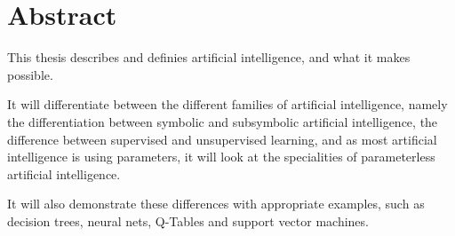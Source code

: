 \chapter*{Abstract}
This thesis describes and definies artificial intelligence, and what it makes possible. 

It will differentiate between the different families of artificial intelligence, namely the differentiation between symbolic and subsymbolic artificial intelligence, the difference between supervised and unsupervised learning, and as most artificial intelligence is using parameters, it will look at the specialities of parameterless artificial intelligence.

It will also demonstrate these differences with appropriate examples, such as decision trees, neural nets, Q-Tables and support vector machines.

